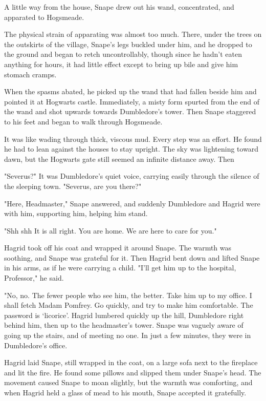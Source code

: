 A little way from the house, Snape drew out his wand, concentrated, and apparated to Hogsmeade.

The physical strain of apparating was almost too much. There, under the trees on the outskirts of the village, Snape's legs buckled under him, and he dropped to the ground and began to retch uncontrollably, though since he hadn't eaten anything for hours, it had little effect except to bring up bile and give him stomach cramps.

When the spasms abated, he picked up the wand that had fallen beside him and pointed it at Hogwarts castle. Immediately, a misty form spurted from the end of the wand and shot upwards towards Dumbledore's tower. Then Snape staggered to his feet and began to walk through Hogsmeade.

It was like wading through thick, viscous mud. Every step was an effort. He found he had to lean against the houses to stay upright. The sky was lightening toward dawn, but the Hogwarts gate still seemed an infinite distance away. Then{\el}

"Severus?" It was Dumbledore's quiet voice, carrying easily through the silence of the sleeping town. "Severus, are you there?"

"Here, Headmaster," Snape answered, and suddenly Dumbledore and Hagrid were with him, supporting him, helping him stand.

"Shh{\el} shh{\el} It is all right. You are home. We are here to care for you."

Hagrid took off his coat and wrapped it around Snape. The warmth was soothing, and Snape was grateful for it. Then Hagrid bent down and lifted Snape in his arms, as if he were carrying a child. "I'll get him up to the hospital, Professor," he said.

"No, no. The fewer people who see him, the better. Take him up to my office. I shall fetch Madam Pomfrey. Go quickly, and try to make him comfortable. The password is `licorice'. Hagrid lumbered quickly up the hill, Dumbledore right behind him, then up to the headmaster's tower. Snape was vaguely aware of going up the stairs, and of meeting no one. In just a few minutes, they were in Dumbledore's office.

Hagrid laid Snape, still wrapped in the coat, on a large sofa next to the fireplace and lit the fire. He found some pillows and slipped them under Snape's head. The movement caused Snape to moan slightly, but the warmth was comforting, and when Hagrid held a glass of mead to his mouth, Snape accepted it gratefully.

